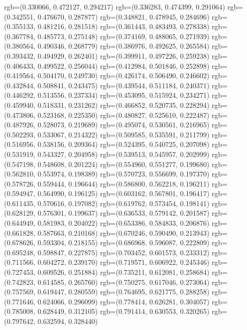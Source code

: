{{{					rgb=(0.330066, 0.472127, 0.294217)
					rgb=(0.336283, 0.474399, 0.291064)
					rgb=(0.342551, 0.476670, 0.287877)
					rgb=(0.348821, 0.478945, 0.284696)
					rgb=(0.355133, 0.481216, 0.281518)
					rgb=(0.361443, 0.483493, 0.278338)
					rgb=(0.367784, 0.485773, 0.275148)
					rgb=(0.374169, 0.488065, 0.271939)
					rgb=(0.380564, 0.490346, 0.268779)
					rgb=(0.386976, 0.492625, 0.265584)
					rgb=(0.393432, 0.494929, 0.262401)
					rgb=(0.399911, 0.497226, 0.259238)
					rgb=(0.406433, 0.499522, 0.256044)
					rgb=(0.412984, 0.501846, 0.252898)
					rgb=(0.419564, 0.504170, 0.249730)
					rgb=(0.426174, 0.506490, 0.246602)
					rgb=(0.432844, 0.508841, 0.243475)
					rgb=(0.439544, 0.511184, 0.240371)
					rgb=(0.446292, 0.513556, 0.237334)
					rgb=(0.453095, 0.515924, 0.234271)
					rgb=(0.459940, 0.518331, 0.231262)
					rgb=(0.466852, 0.520735, 0.228294)
					rgb=(0.473806, 0.523168, 0.225350)
					rgb=(0.480827, 0.525610, 0.222487)
					rgb=(0.487926, 0.528073, 0.219689)
					rgb=(0.495074, 0.530561, 0.216965)
					rgb=(0.502293, 0.533067, 0.214322)
					rgb=(0.509585, 0.535591, 0.211799)
					rgb=(0.516956, 0.538156, 0.209364)
					rgb=(0.524395, 0.540725, 0.207098)
					rgb=(0.531919, 0.543327, 0.204958)
					rgb=(0.539513, 0.545957, 0.202999)
					rgb=(0.547198, 0.548608, 0.201224)
					rgb=(0.554960, 0.551277, 0.199680)
					rgb=(0.562810, 0.553974, 0.198389)
					rgb=(0.570723, 0.556699, 0.197370)
					rgb=(0.578726, 0.559444, 0.196644)
					rgb=(0.586800, 0.562218, 0.196211)
					rgb=(0.594947, 0.564990, 0.196125)
					rgb=(0.603162, 0.567801, 0.196417)
					rgb=(0.611435, 0.570616, 0.197082)
					rgb=(0.619762, 0.573454, 0.198141)
					rgb=(0.628129, 0.576301, 0.199637)
					rgb=(0.636533, 0.579142, 0.201587)
					rgb=(0.644949, 0.581983, 0.204022)
					rgb=(0.653386, 0.584833, 0.206876)
					rgb=(0.661828, 0.587663, 0.210168)
					rgb=(0.670246, 0.590490, 0.213943)
					rgb=(0.678626, 0.593304, 0.218155)
					rgb=(0.686968, 0.596087, 0.222809)
					rgb=(0.695248, 0.598847, 0.227875)
					rgb=(0.703452, 0.601573, 0.233312)
					rgb=(0.711566, 0.604272, 0.239170)
					rgb=(0.719571, 0.606922, 0.245346)
					rgb=(0.727453, 0.609526, 0.251884)
					rgb=(0.735211, 0.612081, 0.258684)
					rgb=(0.742823, 0.614585, 0.265760)
					rgb=(0.750275, 0.617046, 0.273064)
					rgb=(0.757569, 0.619447, 0.280559)
					rgb=(0.764695, 0.621775, 0.288258)
					rgb=(0.771646, 0.624066, 0.296099)
					rgb=(0.778414, 0.626281, 0.304057)
					rgb=(0.785008, 0.628449, 0.312105)
					rgb=(0.791414, 0.630553, 0.320265)
					rgb=(0.797642, 0.632594, 0.328440)
}}}

